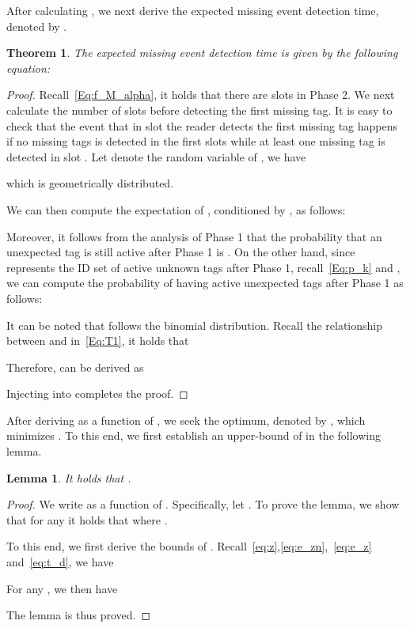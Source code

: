 \documentclass[10pt, twocolumn]{IEEEtran}
\newtheorem{lemma}{Lemma}
\newtheorem{theorem}{Theorem}
\begin{document}
After calculating , we next derive the expected missing event detection time, denoted by .

\begin{theorem}
\label{Th:T_Z}
The expected missing event detection time  is given by the following equation:

\end{theorem}

\begin{proof}
Recall~\eqref{Eq:f_M_alpha}, it holds that there are   slots in Phase 2. We next calculate the number of slots before detecting the first missing tag.
It is easy to check that the event that in slot  the reader detects the first missing tag happens if no missing tags is detected in the first  slots while at least one missing tag is detected in slot . Let  denote the random variable of , we have

which is geometrically distributed.

We can then compute the expectation of , conditioned by , as follows:


Moreover, it follows from the analysis of Phase 1 that the probability that an unexpected tag is still active after Phase 1 is .
On the other hand, since  represents the ID set of active unknown tags after Phase 1, recall~\eqref{Eq:p_k} and , we can compute the probability of having  active unexpected tags after Phase 1 as follows:

It can be noted that  follows the binomial distribution.
Recall the relationship between  and  in~\eqref{Eq:T1}, it holds that


Therefore,  can be derived as

Injecting  into  completes the proof.
\end{proof}



After deriving  as a function of , we seek the optimum, denoted by , which minimizes . To this end, we first establish an upper-bound of  in the following lemma.

\begin{lemma}
\label{Lem:x_opt_upp}
It holds that .
\end{lemma}

\begin{proof}
We write  as a function of . Specifically, let . To prove the lemma, we show that for any  it holds that  where .

To this end, we first derive the bounds of .
Recall~\eqref{eq:z},\eqref{eq:e_zn},~\eqref{eq:e_z} and~\eqref{eq:t_d}, we have


For any , we then have

The lemma is thus proved.
\end{proof}
\end{document}
